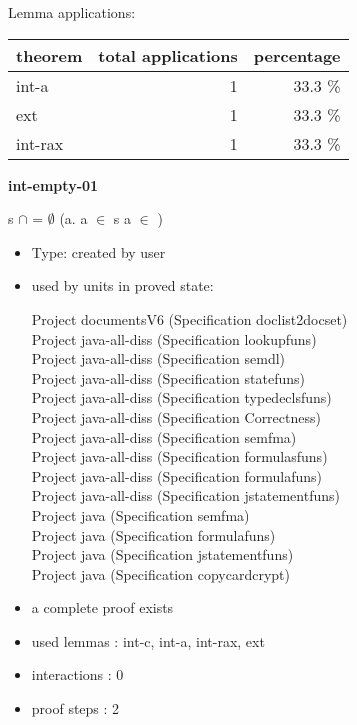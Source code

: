 \documentclass[a4paper]{article}
\begin{document}
Lemma applications:

\begin{supertabular}{l|r|r}
theorem	        & total applications & percentage \\ \hline
int-a & 1 & 33.3 \% \\
ext & 1 & 33.3 \% \\
int-rax & 1 & 33.3 \% \\

\end{supertabular}
\pagebreak

{\LARGE\bf int-empty-01}\label{lemma-int-empty-01}

\medskip

 \Fol s $\cap$  = $\emptyset$ \Equiv (\All a. \Not a $\in$ s \Or \Not a $\in$ )

\begin{itemize}

\item Type: created by user

\item used by units in proved state:

Project documentsV6 (Specification doclist2docset) \\
Project java-all-diss (Specification lookupfuns) \\
Project java-all-diss (Specification semdl) \\
Project java-all-diss (Specification statefuns) \\
Project java-all-diss (Specification typedeclsfuns) \\
Project java-all-diss (Specification Correctness) \\
Project java-all-diss (Specification semfma) \\
Project java-all-diss (Specification formulasfuns) \\
Project java-all-diss (Specification formulafuns) \\
Project java-all-diss (Specification jstatementfuns) \\
Project java (Specification semfma) \\
Project java (Specification formulafuns) \\
Project java (Specification jstatementfuns) \\
Project java (Specification copycardcrypt)
\item       a complete proof exists
\item       used lemmas  : int-c, int-a, int-rax, ext
\item       interactions : 0
\item       proof steps  : 2
\end{itemize}
\end{document}
